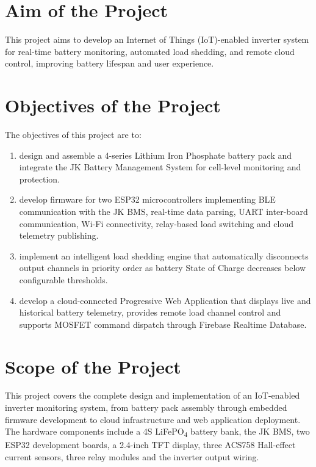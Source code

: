 \documentclass[12pt, a4paper]{report}
\begin{document}
\section{Aim of the Project}

This project aims to develop an Internet of Things (IoT)-enabled inverter system for real-time battery monitoring, automated load shedding, and remote cloud control, improving battery lifespan and user experience.


\section{Objectives of the Project}

The objectives of this project are to:

\begin{enumerate}[noitemsep, leftmargin=0.7in, label=\roman*.]
  \item design and assemble a 4-series Lithium Iron Phosphate battery
        pack and integrate the JK Battery Management System for cell-level
        monitoring and protection.
  \item develop firmware for two ESP32 microcontrollers implementing
        BLE communication with the JK BMS, real-time data parsing,
        UART inter-board communication, Wi-Fi connectivity, relay-based
        load switching and cloud telemetry publishing.
  \item implement an intelligent load shedding engine that
        automatically disconnects output channels in priority order as
        battery State of Charge decreases below configurable thresholds.
  \item develop a cloud-connected Progressive Web Application that
        displays live and historical battery telemetry, provides remote
        load channel control and supports MOSFET command dispatch through
        Firebase Realtime Database.
\end{enumerate}

\section{Scope of the Project}

This project covers the complete design and implementation of an
IoT-enabled inverter monitoring system, from battery pack assembly through
embedded firmware development to cloud infrastructure and web application
deployment. The hardware components include a 4S LiFePO\textsubscript{4}
battery bank, the JK BMS, two ESP32 development boards, a 2.4-inch TFT
display, three ACS758 Hall-effect current sensors, three relay modules and
the inverter output wiring.
\end{document}
